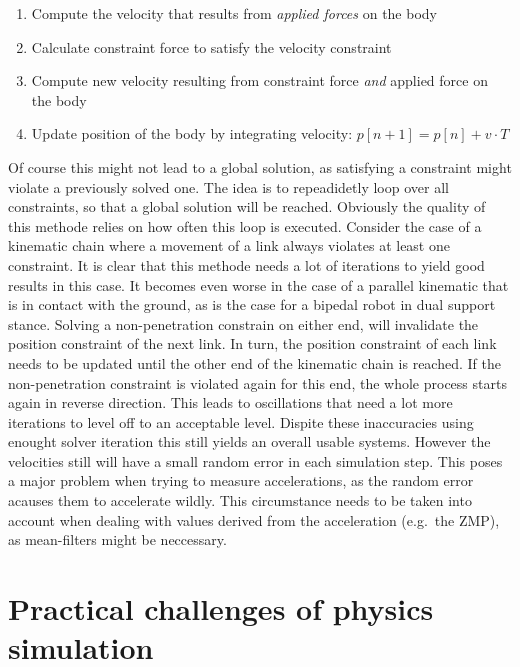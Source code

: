 \documentclass[english,ngerman]{KITreprt}
\begin{document}
\begin{enumerate}
\def\labelenumi{\arabic{enumi}.}
\itemsep1pt\parskip0pt
\item
  Compute the velocity that results from \emph{applied forces} on the
  body
\item
  Calculate constraint force to satisfy the velocity constraint
\item
  Compute new velocity resulting from constraint force \emph{and}
  applied force on the body
\item
  Update position of the body by integrating velocity:
  $p[n+1] = p[n] + v \cdot T$
\end{enumerate}

Of course this might not lead to a global solution, as satisfying a
constraint might violate a previously solved one. The idea is to
repeadidetly loop over all constraints, so that a global solution will
be reached. Obviously the quality of this methode relies on how often
this loop is executed. Consider the case of a kinematic chain where a
movement of a link always violates at least one constraint. It is clear
that this methode needs a lot of iterations to yield good results in
this case. It becomes even worse in the case of a parallel kinematic
that is in contact with the ground, as is the case for a bipedal robot
in dual support stance. Solving a non-penetration constrain on either
end, will invalidate the position constraint of the next link. In turn,
the position constraint of each link needs to be updated until the other
end of the kinematic chain is reached. If the non-penetration constraint
is violated again for this end, the whole process starts again in
reverse direction. This leads to oscillations that need a lot more
iterations to level off to an acceptable level. Dispite these
inaccuracies using enought solver iteration this still yields an overall
usable systems. However the velocities still will have a small random
error in each simulation step. This poses a major problem when trying to
measure accelerations, as the random error acauses them to accelerate
wildly. This circumstance needs to be taken into account when dealing
with values derived from the acceleration (e.g.~the ZMP), as
mean-filters might be neccessary.

\section{Practical challenges of physics
simulation}\label{practical-challenges-of-physics-simulation}
\end{document}
